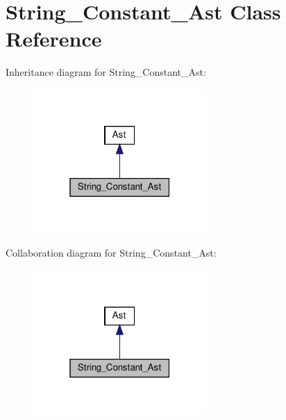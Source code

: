 \hypertarget{classString__Constant__Ast}{}\section{String\+\_\+\+Constant\+\_\+\+Ast Class Reference}
\label{classString__Constant__Ast}


Inheritance diagram for String\+\_\+\+Constant\+\_\+\+Ast\+:
\nopagebreak
\begin{figure}[H]
\begin{center}
\leavevmode
\includegraphics[width=187pt]{classString__Constant__Ast__inherit__graph}
\end{center}
\end{figure}


Collaboration diagram for String\+\_\+\+Constant\+\_\+\+Ast\+:
\nopagebreak
\begin{figure}[H]
\begin{center}
\leavevmode
\includegraphics[width=187pt]{classString__Constant__Ast__coll__graph}
\end{center}
\end{figure}
